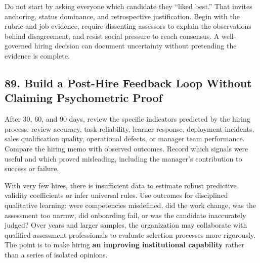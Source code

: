 Do not start by asking everyone which candidate they ``liked best.'' That invites anchoring, status dominance, and retrospective justification. Begin with the rubric and job evidence, require dissenting assessors to explain the observations behind disagreement, and resist social pressure to reach consensus. A well-governed hiring decision can document uncertainty without pretending the evidence is complete.

\subsection*{89. Build a Post-Hire Feedback Loop Without Claiming Psychometric Proof}

After 30, 60, and 90 days, review the specific indicators predicted by the hiring process: review accuracy, task reliability, learner response, deployment incidents, sales qualification quality, operational defects, or manager team performance. Compare the hiring memo with observed outcomes. Record which signals were useful and which proved misleading, including the manager's contribution to success or failure.

With very few hires, there is insufficient data to estimate robust predictive validity coefficients or infer universal rules. Use outcomes for disciplined qualitative learning: were competencies misdefined, did the work change, was the assessment too narrow, did onboarding fail, or was the candidate inaccurately judged? Over years and larger samples, the organization may collaborate with qualified assessment professionals to evaluate selection processes more rigorously. The point is to make hiring \textbf{an improving institutional capability} rather than a series of isolated opinions.
